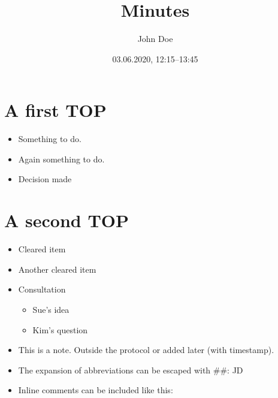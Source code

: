 \documentclass[11pt]{article}
\author{John Doe}
\date{03.06.2020, 12:15--13:45}
\title{Minutes}
\begin{document}
\maketitle
\tableofcontents


\section{\texorpdfstring{}{}A first TOP}
\label{sec:orge8e7c9c}
\begin{itemize}
\item {} Something to do.
\item \ActionTag{}{::} \ActionTagMargin{}Again something to do.
\item \EntscheidungTag{}{::} \EntscheidungTagMargin{ }Decision made
\end{itemize}
\section{A second TOP}
\label{sec:org20ad65b}
\begin{itemize}
\item {} Cleared item
\item \ClearedTag{}{::} \ClearedTagMargin{ }Another cleared item
\item \ConsultationTag{}{::} \ConsultationTagMargin{ }Consultation 
\begin{itemize}
\item {}Sue's idea
\item {}Kim's question
\end{itemize}
\item \NoteTag{\textit{[2020-06-03 Wed 10:39]}}{}{::}This is a note. Outside the protocol or added later (with timestamp).
\item The expansion of abbreviations can be escaped with \#{}\#: JD
\item Inline comments can be included like this: 
\end{itemize}
\end{document}
